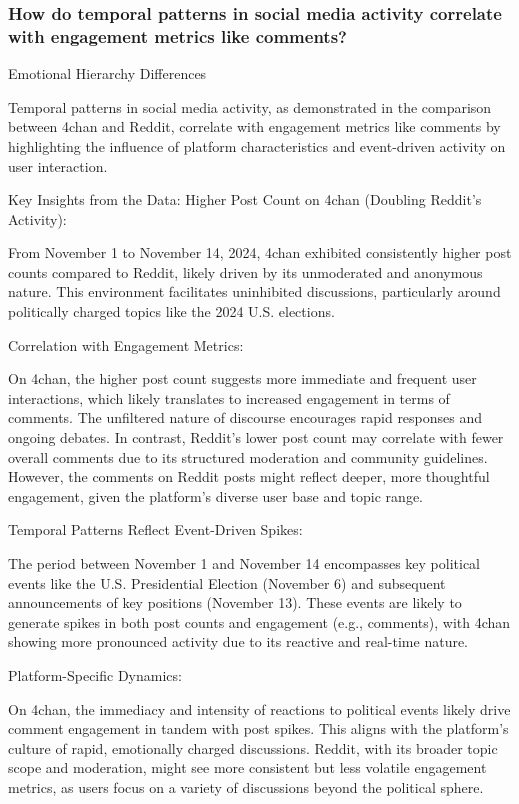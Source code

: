 \documentclass[sigconf]{acmart}
\begin{document}
\subsubsection{How do temporal patterns in social media activity correlate
with engagement metrics like comments?}
{Emotional Hierarchy Differences}
{Temporal patterns in social media activity, as demonstrated in the comparison between 4chan and Reddit, correlate with engagement metrics like comments by highlighting the influence of platform characteristics and event-driven activity on user interaction.

Key Insights from the Data:
Higher Post Count on 4chan (Doubling Reddit’s Activity):

From November 1 to November 14, 2024, 4chan exhibited consistently higher post counts compared to Reddit, likely driven by its unmoderated and anonymous nature. This environment facilitates uninhibited discussions, particularly around politically charged topics like the 2024 U.S. elections.

Correlation with Engagement Metrics:

On 4chan, the higher post count suggests more immediate and frequent user interactions, which likely translates to increased engagement in terms of comments. The unfiltered nature of discourse encourages rapid responses and ongoing debates.
In contrast, Reddit’s lower post count may correlate with fewer overall comments due to its structured moderation and community guidelines. However, the comments on Reddit posts might reflect deeper, more thoughtful engagement, given the platform's diverse user base and topic range.

Temporal Patterns Reflect Event-Driven Spikes:

The period between November 1 and November 14 encompasses key political events like the U.S. Presidential Election (November 6) and subsequent announcements of key positions (November 13). These events are likely to generate spikes in both post counts and engagement (e.g., comments), with 4chan showing more pronounced activity due to its reactive and real-time nature.

Platform-Specific Dynamics:

On 4chan, the immediacy and intensity of reactions to political events likely drive comment engagement in tandem with post spikes. This aligns with the platform’s culture of rapid, emotionally charged discussions.
Reddit, with its broader topic scope and moderation, might see more consistent but less volatile engagement metrics, as users focus on a variety of discussions beyond the political sphere.}
\end{document}
